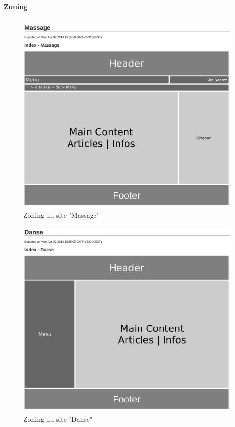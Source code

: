 \documentclass[11pt,a4paper]{report}
\begin{document}
			\paragraph*{Zoning}\subparagraph*{}
				\begin{figure}[H]
					\centering
					\includegraphics[height=10cm]{Zone-Massage.eps}
					\caption{Zoning du site "Massage"}
					\label{fig:Zoning-Massage}
				\end{figure}
				\begin{figure}[H]
					\centering
					\includegraphics[height=10cm]{Zone-Danse.eps}
					\caption{Zoning du site "Danse"}
					\label{fig:Zoning-Danse}
				\end{figure}
\end{document}
